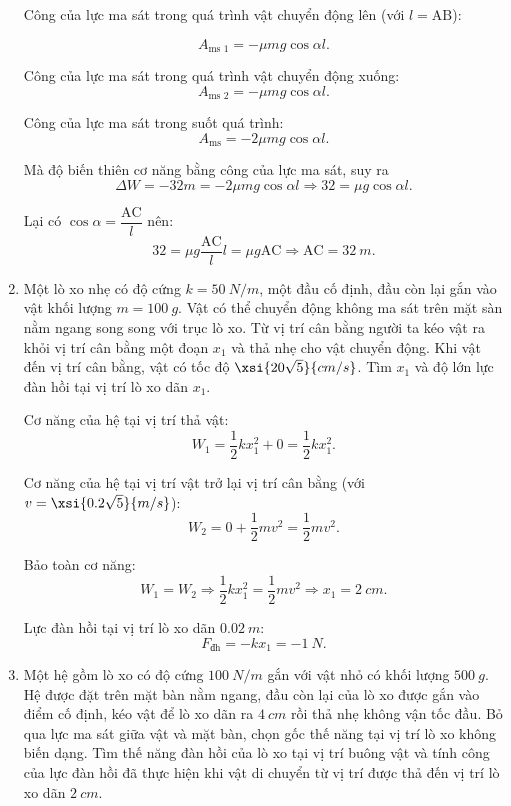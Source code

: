 \begin{enumerate}[label=\bfseries Câu \arabic*:]
{		Công của lực ma sát trong quá trình vật chuyển động lên (với $l=\text{AB}$):
		
		$$A_\text{ms 1} = -\mu mg \cos \alpha l.$$
		
		Công của lực ma sát trong quá trình vật chuyển động xuống:
		$$A_\text{ms 2} = -\mu mg \cos \alpha l.$$
		
		Công của lực ma sát trong suốt quá trình:
		$$A_\text{ms} = - 2\mu mg \cos \alpha l.$$
		
		Mà độ biến thiên cơ năng bằng công của lực ma sát, suy ra
		$$\Delta W = -32m = - 2\mu mg \cos \alpha l \Rightarrow 32 =\mu g \cos \alpha l.$$
		
		Lại có $\cos \alpha = \dfrac{\text{AC}}{l}$ nên:
		$$32 =\mu g \dfrac{\text{AC}}{l} l = \mu g \text{AC} \Rightarrow \text{AC} = \SI{32}{m}.$$
	}
	\item {}
	
	
	{
			Một lò xo nhẹ có độ cứng $k=\SI{50}{N/m}$, một đầu cố định, đầu còn lại gắn vào vật khối lượng $m=\SI{100}{g}$. Vật có thể chuyển động không ma sát trên mặt sàn nằm ngang song song với trục lò xo. Từ vị trí cân bằng người ta kéo vật ra khỏi vị trí cân bằng một đoạn $x_1$ và thả nhẹ cho vật chuyển động. Khi vật đến vị trí cân bằng, vật có tốc độ $\xsi{20\sqrt 5}{cm/s}$. Tìm $x_1$ và độ lớn lực đàn hồi tại vị trí lò xo dãn $x_1$.
	}
	
	\hideall
	{	
			Cơ năng của hệ tại vị trí thả vật:
		$$W_1 = \dfrac{1}{2}kx_1^2 +0 = \dfrac{1}{2}kx_1^2.$$
		
		Cơ năng của hệ tại vị trí vật trở lại vị trí cân bằng (với $v=\xsi{0.2\sqrt5}{m/s}$):
		$$W_2 = 0 + \dfrac{1}{2}mv^2 = \dfrac{1}{2}mv^2.$$
		
		Bảo toàn cơ năng:
		$$W_1 = W_2 \Rightarrow \dfrac{1}{2}kx_1^2 = \dfrac{1}{2}mv^2 \Rightarrow x_1 = \SI{2}{cm}.$$
		
		Lực đàn hồi tại vị trí lò xo dãn $\SI{0.02}{m}$:
		$$F_\text{đh} = -kx_1 = \SI{-1}{N}.$$
	}
	\item {}
	
	
	{
		Một hệ gồm lò xo có độ cứng $\SI{100}{N/m}$ gắn với vật nhỏ có khối lượng $\SI{500}{g}$. Hệ được đặt trên mặt bàn nằm ngang, đầu còn lại của lò xo được gắn vào điểm cố định, kéo vật để lò xo dãn ra $\SI{4}{cm}$ rồi thả nhẹ không vận tốc đầu. Bỏ qua lực ma sát giữa vật và mặt bàn, chọn gốc thế năng tại vị trí lò xo không biến dạng. Tìm thế năng đàn hồi của lò xo tại vị trí buông vật và tính công của lực đàn hồi đã thực hiện khi vật di chuyển từ vị trí được thả đến vị trí lò xo dãn $\SI{2}{cm}$.
	}
	

\end{enumerate}
